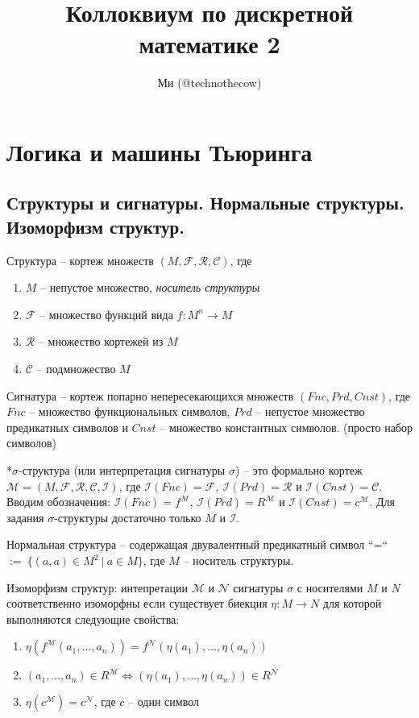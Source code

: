 \documentclass[a4paper, 10pt]{article}
\title{Коллоквиум по дискретной математике 2}
\date{}
\author{Ми (@technothecow)}
\newcommand{\FF}{\mathcal{F}}
\newcommand{\RR}{\mathcal{R}}
\newcommand{\CC}{\mathcal{C}}
\newcommand{\MM}{\mathcal{M}}
\newcommand{\II}{\mathcal{I}}
\newcommand{\NN}{\mathcal{N}}
\begin{document}
\maketitle

\tableofcontents

\newpage

\section{Логика и машины Тьюринга}

\subsection{Структуры и сигнатуры. Нормальные структуры. Изоморфизм структур.}

Структура -- кортеж множеств $(M, \FF, \RR, \CC)$, где 
\begin{enumerate}
    \item $M$ -- непустое множество, \textit{носитель структуры}
    \item $\FF$ -- множество функций вида $f\colon M^n\to M$
    \item $\RR$ -- множество кортежей из $M$
    \item $\CC$ -- подмножество $M$
\end{enumerate}

Сигнатура -- кортеж попарно непересекающихся множеств $(Fnc,Prd,Cnst)$, где $Fnc$ -- множество функциональных символов, $Prd$ -- непустое множество предикатных символов и $Cnst$ -- множество константных символов. (просто набор символов)

*$\sigma$-структура (или интерпретация сигнатуры $\sigma$) -- это формально кортеж $\MM = (M,\FF,\RR,\CC,\II)$, где $\II(Fnc)=\FF,~\II(Prd)=\RR$ и $\II(Cnst)=\CC$. Вводим обозначения: $\II(Fnc)=f^\MM$, $\II(Prd)=R^\MM$ и $\II(Cnst)=c^\MM$. Для задания $\sigma$-структуры достаточно только $M$ и $\II$.

Нормальная структура -- содержащая двувалентный предикатный символ ``=`` $:=~\{(a, a) \in M^2~|~a \in M\}$, где $M$ -- носитель структуры.


Изоморфизм структур: интепретации $\MM$ и $\NN$ сигнатуры $\sigma$ с носителями $M$ и $N$ соответственно изоморфны если существует биекция $\eta \colon M \to N$ для которой выполняются следующие свойства:
\begin{enumerate}
    \item $\eta(f^\MM(a_1,\ldots,a_n))=f^\NN(\eta(a_1),\ldots,\eta(a_n))$
    \item $(a_1,\ldots,a_n)\in R^\MM \iff (\eta(a_1),\ldots,\eta(a_n))\in R^\NN$
    \item $\eta(c^\MM) = c^\NN$, где $c$ -- один символ
\end{enumerate}
\end{document}
